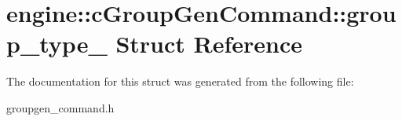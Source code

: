 \hypertarget{structengine_1_1cGroupGenCommand_1_1group__type__}{\section{engine\-:\-:c\-Group\-Gen\-Command\-:\-:group\-\_\-type\-\_\- \-Struct \-Reference}
\label{structengine_1_1cGroupGenCommand_1_1group__type__}
}


\-The documentation for this struct was generated from the following file\-:\begin{DoxyCompactItemize}
\item 
groupgen\-\_\-command.\-h\end{DoxyCompactItemize}
